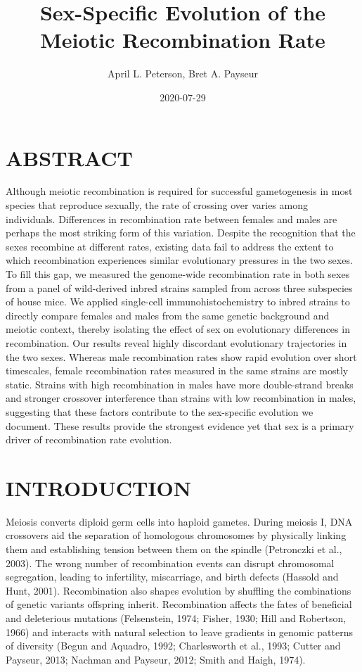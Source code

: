 \documentclass[
]{article}
\title{Sex-Specific Evolution of the Meiotic Recombination Rate}
\author{April L. Peterson, Bret A. Payseur}
\date{2020-07-29}
\begin{document}
\maketitle

\hypertarget{abstract}{%
\section{ABSTRACT}\label{abstract}}

Although meiotic recombination is required for successful gametogenesis
in most species that reproduce sexually, the rate of crossing over
varies among individuals. Differences in recombination rate between
females and males are perhaps the most striking form of this variation.
Despite the recognition that the sexes recombine at different rates,
existing data fail to address the extent to which recombination
experiences similar evolutionary pressures in the two sexes. To fill
this gap, we measured the genome-wide recombination rate in both sexes
from a panel of wild-derived inbred strains sampled from across three
subspecies of house mice. We applied single-cell immunohistochemistry to
inbred strains to directly compare females and males from the same
genetic background and meiotic context, thereby isolating the effect of
sex on evolutionary differences in recombination. Our results reveal
highly discordant evolutionary trajectories in the two sexes. Whereas
male recombination rates show rapid evolution over short timescales,
female recombination rates measured in the same strains are mostly
static. Strains with high recombination in males have more double-strand
breaks and stronger crossover interference than strains with low
recombination in males, suggesting that these factors contribute to the
sex-specific evolution we document. These results provide the strongest
evidence yet that sex is a primary driver of recombination rate
evolution.

\hypertarget{introduction}{%
\section{INTRODUCTION}\label{introduction}}

Meiosis converts diploid germ cells into haploid gametes. During meiosis
I, DNA crossovers aid the separation of homologous chromosomes by
physically linking them and establishing tension between them on the
spindle (Petronczki et al., 2003). The wrong number of recombination
events can disrupt chromosomal segregation, leading to infertility,
miscarriage, and birth defects (Hassold and Hunt, 2001). Recombination
also shapes evolution by shuffling the combinations of genetic variants
offspring inherit. Recombination affects the fates of beneficial and
deleterious mutations (Felsenstein, 1974; Fisher, 1930; Hill and
Robertson, 1966) and interacts with natural selection to leave gradients
in genomic patterns of diversity (Begun and Aquadro, 1992; Charlesworth
et al., 1993; Cutter and Payseur, 2013; Nachman and Payseur, 2012; Smith
and Haigh, 1974).
\end{document}
